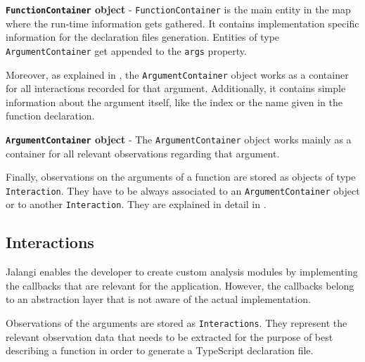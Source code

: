 \begin{code}
  \caption[FunctionContainer object]{\textbf{\texttt{FunctionContainer} object} - \texttt{FunctionContainer} is the main entity in the map where the run-time information gets gathered. It contains implementation specific information for the declaration files generation. Entities of type \texttt{ArgumentContainer} get appended to the \texttt{args} property.}
  \label{code:function-container}
\end{code}

Moreover, as explained in , the \texttt{ArgumentContainer} object works as a container for all interactions recorded for that argument. Additionally, it contains simple information about the argument itself, like the index or the name given in the function declaration.

\begin{code}
  \caption[ArgumentContainer object]{\textbf{\texttt{ArgumentContainer} object} - The \texttt{ArgumentContainer} object works mainly as a container for all relevant observations regarding that argument.}
  \label{code:argument-container}
\end{code}

Finally, observations on the arguments of a function are stored as objects of type \texttt{Interaction}. They have to be always associated to an \texttt{ArgumentContainer} object or to another \texttt{Interaction}. They are explained in detail in .

\subsection{Interactions} \label{sec:run-time-interactions}
Jalangi enables the developer to create custom analysis modules by implementing the callbacks that are relevant for the application. However, the callbacks belong to an abstraction layer that is not aware of the actual implementation. 

Observations of the arguments are stored as \texttt{Interactions}. They represent the relevant observation data that needs to be extracted for the purpose of best describing a function in order to generate a TypeScript declaration file.

